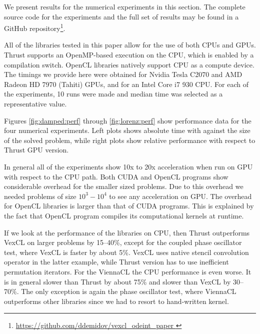 \documentclass[1p]{elsarticle}
\begin{document}
We present results for the numerical experiments in this section. The complete
source code for the experiments and the full set of results may be found in a
GitHub repository\footnote{ \href{
https://github.com/ddemidov/vexcl_odeint_paper } {
https://github.com/ddemidov/vexcl\_odeint\_paper } }.


All of the libraries tested in this paper allow for the use of both CPUs and
GPUs.  Thrust supports an OpenMP-based execution on the CPU, which is enabled
by a compilation switch. OpenCL libraries natively support CPU as a compute
device.  The timings we provide here were obtained for Nvidia Tesla C2070 and
AMD Radeon HD 7970 (Tahiti) GPUs, and for an Intel Core i7 930 CPU. For each of
the experiments, 10 runs were made and median time was selected as a
representative value.

Figures \ref{fig:damped:perf} through \ref{fig:lorenz:perf} show performance
data for the four numerical experiments. Left plots shows absolute time with
against the size of the solved problem, while right plots show relative
performance with respect to Thrust GPU version.


In general all of the experiments show 10x to 20x acceleration when run on GPU
with respect to the CPU path. Both CUDA and OpenCL programs show considerable
overhead for the smaller sized problems. Due to this overhead we needed
problems of size $10^3-10^4$ to see any acceleration on GPU. The overhead for
OpenCL libraries is larger than that of CUDA programs. This is explained by the
fact that OpenCL program compiles its computational kernels at runtime.


If we look at the performance of the libraries on CPU, then Thrust outperforms
VexCL on larger problems by 15--40\%, except for the coupled phase oscillator
test, where VexCL is faster by about 5\%. VexCL uses native stencil convolution
operator in the latter example, while Thrust version has to use inefficient
permutation iterators. For the ViennaCL the CPU performance is even worse. It
is in general slower than Thrust by about 75\%  and slower than VexCL by
30--70\%. The only exception is again the phase oscillator test, where ViennaCL
outperforms other libraries since we had to resort to hand-written kernel.
\end{document}
